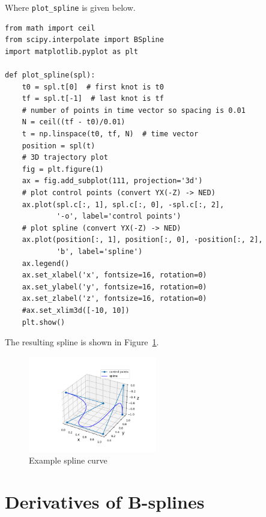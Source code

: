 \documentclass{article}
\begin{document}
Where {\tt plot\_spline} is given below.
\begin{lstlisting}
from math import ceil
from scipy.interpolate import BSpline
import matplotlib.pyplot as plt

def plot_spline(spl):
    t0 = spl.t[0]  # first knot is t0
    tf = spl.t[-1]  # last knot is tf
    # number of points in time vector so spacing is 0.01
    N = ceil((tf - t0)/0.01)
    t = np.linspace(t0, tf, N)  # time vector
    position = spl(t)
    # 3D trajectory plot
    fig = plt.figure(1)
    ax = fig.add_subplot(111, projection='3d')
    # plot control points (convert YX(-Z) -> NED)
    ax.plot(spl.c[:, 1], spl.c[:, 0], -spl.c[:, 2],
            '-o', label='control points')
    # plot spline (convert YX(-Z) -> NED)
    ax.plot(position[:, 1], position[:, 0], -position[:, 2],
            'b', label='spline')
    ax.legend()
    ax.set_xlabel('x', fontsize=16, rotation=0)
    ax.set_ylabel('y', fontsize=16, rotation=0)
    ax.set_zlabel('z', fontsize=16, rotation=0)
    #ax.set_xlim3d([-10, 10])
    plt.show()
\end{lstlisting}

The resulting spline is shown in Figure~\ref{fig:example_spline_curve}.
\begin{figure}[hbt]
  \centering\includegraphics[width=0.5\textwidth]{./figures/example_spline_curve}
  \caption{Example spline curve}
  \label{fig:example_spline_curve}  
\end{figure}

\section{Derivatives of B-splines}
\end{document}
